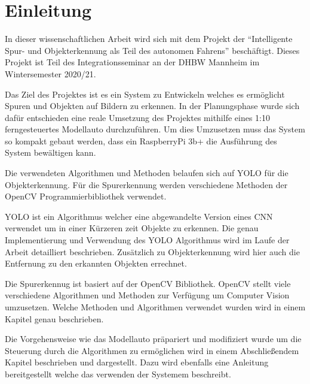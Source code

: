 \chapter{Einleitung}

In dieser wissenschaftlichen Arbeit wird sich mit dem Projekt der \enquote{Intelligente Spur- und Objekterkennung als Teil des autonomen Fahrens} beschäftigt.
Dieses Projekt ist Teil des Integrationsseminar an der \ac{DHBW} Mannheim im Wintersemester 2020/21.

Das Ziel des Projektes ist es ein System zu Entwickeln welches es ermöglicht Spuren und Objekten auf Bildern zu erkennen.
In der Planungsphase wurde sich dafür entschieden eine reale Umsetzung des Projektes mithilfe eines 1:10 ferngesteuertes Modellauto durchzuführen.
Um dies Umzusetzen muss das System so kompakt gebaut werden, dass ein RaspberryPi 3b+ die Ausführung des System bewältigen kann. 

Die verwendeten Algorithmen und Methoden belaufen sich auf \ac{YOLO} für die Objekterkennung. Für die Spurerkennung werden verschiedene Methoden der \ac{OpenCV} Programmierbibliothek verwendet.

\ac{YOLO} ist ein Algorithmus welcher eine abgewandelte Version eines \ac{CNN} verwendet um in einer Kürzeren zeit Objekte zu erkennen. 
Die genau Implementierung und Verwendung des \ac{YOLO} Algorithmus wird im Laufe der Arbeit detailliert beschrieben. 
Zusätzlich zu Objekterkennung wird hier auch die Entfernung zu den erkannten Objekten errechnet.

Die Spurerkennug ist basiert auf der \ac{OpenCV} Bibliothek. \ac{OpenCV} stellt viele verschiedene Algorithmen und Methoden zur Verfügung um Computer Vision umzusetzen. 
Welche Methoden und Algorithmen verwendet wurden wird in einem Kapitel genau beschrieben.

Die Vorgehensweise wie das Modellauto präpariert und modifiziert wurde um die Steuerung durch die Algorithmen zu ermöglichen wird in einem Abschließendem Kapitel beschrieben und dargestellt.
Dazu wird ebenfalls eine Anleitung bereitgestellt welche das verwenden der Systemem beschreibt.

